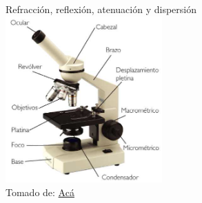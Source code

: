 \documentclass[aspectratio=169]{beamer}
\begin{document}
\begin{frame}{Refracción, reflexión, atenuación y dispersión}
            \centering
            \includegraphics[width = 6cm]{fig/Optica/microscopio_optico.png}\\
            \tiny{Tomado de: \href{https://www.pardell.es/microscopia-optica.html}{Acá}}

\end{frame}
\end{document}
